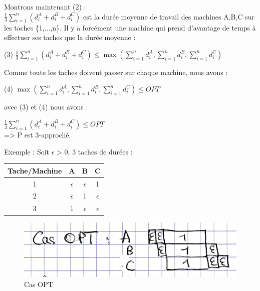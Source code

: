 \documentclass[12pt]{article}
\begin{document}
Montrons maintenant (2) :\\

$\frac{1}{3}\displaystyle\sum_{i=1}^n(d_i^A+d_i^B+d_i^C)$ est la durée moyenne de travail des machines A,B,C sur les taches \{1,...,n\}. Il y a forcément une machine qui prend d'avantage de temps à effectuer ses taches que la durée moyenne :\\
\begin{center}
(3) $\frac{1}{3}\displaystyle\sum_{i=1}^n(d_i^A+d_i^B+d_i^C) \le \max(\displaystyle\sum_{i=1}^n d_i^A,\displaystyle\sum_{i=1}^n d_i^B,\displaystyle\sum_{i=1}^n d_i^C)$\\
\end{center}
Comme toute les taches doivent passer sur chaque machine, nous avons :\\
\begin{center}
(4) $\max(\displaystyle\sum_{i=1}^n d_i^A,\displaystyle\sum_{i=1}^n d_i^B,\displaystyle\sum_{i=1}^n d_i^C) \le OPT$\\
\end{center}
avec (3) et (4) nous avons :\\
\begin{center}
$\frac{1}{3}\displaystyle\sum_{i=1}^n(d_i^A+d_i^B+d_i^C) \le OPT$\\

=> P est 3-approché.
\end{center}
Exemple : Soit $\epsilon$ > 0, 3 taches de durées :\\
\begin{center}
\begin{tabular}{|c|c|c|c|}
\hline 
Tache/Machine & A & B & C \\ 
\hline 
1 & $\epsilon$ & $\epsilon$ & 1 \\ 
\hline 
2 & $\epsilon$ & 1 & $\epsilon$ \\ 
\hline 
3 & 1 & $\epsilon$ & $\epsilon$ \\ 
\hline 
\end{tabular} 
\end{center}

\begin{figure}[!ht]
\centering
\centerline{\includegraphics[scale=1]{1.jpg}}
\caption{Cas OPT}
\label{opt1}
\end{figure}
\end{document}
